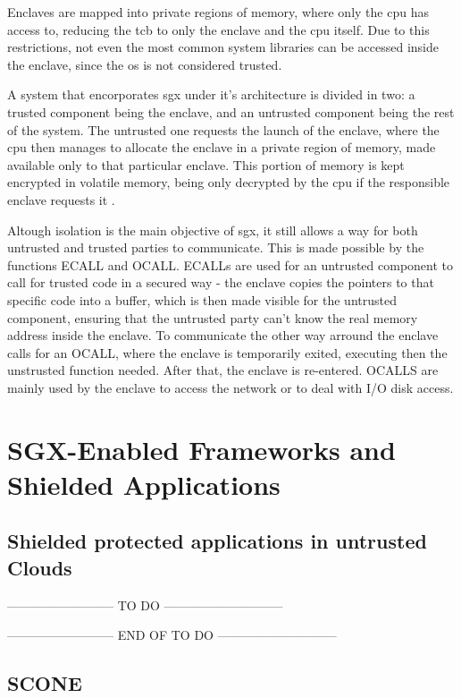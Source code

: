Enclaves are mapped into private regions of memory, where only the \gls{cpu} has access to, reducing the \gls{tcb} to only the enclave and the \gls{cpu} itself. Due to this restrictions, not even the most common system libraries can be accessed inside the enclave, since the \gls{os} is not considered trusted. 

A system that encorporates \gls{sgx} under it's architecture is divided in two: a trusted component being the enclave, and an untrusted component being the rest of the system. The untrusted one requests the launch of the enclave, where the \gls{cpu} then manages to allocate the enclave in a private region of memory, made available only to that particular enclave. This portion of memory is kept encrypted in volatile memory, being only decrypted by the \gls{cpu} if the responsible enclave requests it \cite{guiBorgesThesis}.

Altough isolation is the main objective of \gls{sgx}, it still allows a way for both  untrusted and trusted parties to communicate. This is made possible by the functions ECALL and OCALL. ECALLs are used for an untrusted component to call for trusted code in a secured way - the enclave copies the pointers to that specific code into a buffer, which is then made visible for the untrusted component, ensuring that the untrusted party can't know the real memory address inside the enclave. To communicate the other way arround the enclave calls for an OCALL, where the enclave is temporarily exited, executing then the unstrusted function needed. After that, the enclave is re-entered. OCALLS are mainly used by the enclave to access the network or to deal with I/O disk access.

\section{SGX-Enabled Frameworks and Shielded Applications}
\subsection{Shielded protected applications in untrusted Clouds}

-------------------------- TO DO -----------------------------



-------------------------- END OF TO DO -----------------------------

\subsection{SCONE}

